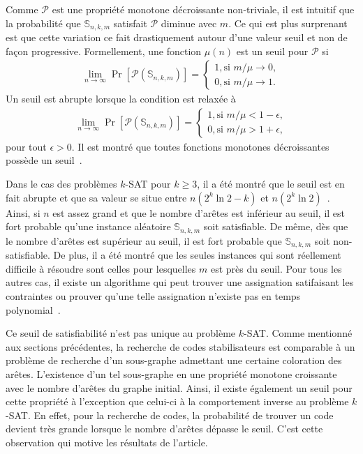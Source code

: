 Comme $\mathcal P$ est une propriété monotone décroissante non-triviale,
il est intuitif que la probabilité que $\mathbb S_{n,k,m}$ satisfait 
$\mathcal P$ diminue avec $m$.
Ce qui est plus surprenant est que cette variation ce fait drastiquement 
autour d'une valeur seuil et non de façon progressive.
Formellement,
une fonction $\mu(n)$ est un seuil pour $\mathcal P$ si 
\begin{align}
  \lim_{n \to \infty} \Pr[\mathcal P(\mathbb S_{n,k,m})] 
  =
  \begin{cases}
    1, \text{si } m / \mu \to 0, \\
    0, \text{si } m / \mu \to 1.
  \end{cases}
\end{align}
Un seuil est abrupte lorsque la condition est relaxée à
\begin{align}
  \lim_{n \to \infty} \Pr[\mathcal P(\mathbb S_{n,k,m})] 
  =
  \begin{cases}
    1, \text{si } m / \mu < 1 - \epsilon, \\
    0, \text{si } m / \mu > 1 + \epsilon,
  \end{cases}
\end{align}
pour tout $\epsilon > 0$.
Il est montré que toutes fonctions monotones décroissantes
possède un seuil~\cite{bollobas_threshold_1987}.

Dans le cas des problèmes $k$-SAT pour $k \geq 3$,
il a été montré que le seuil est en fait abrupte et que sa valeur se
situe entre $n(2^k \ln 2 - k)$ et $n(2^k \ln 2)$~\cite{achlioptas_rigorous_2005}.
Ainsi, si $n$ est assez grand et que le nombre d'arêtes est inférieur au seuil,
il est fort probable qu'une instance aléatoire $\mathbb S_{n,k,m}$ soit satisfiable.
De même,
dès que le nombre d'arêtes est supérieur au seuil,
il est fort probable que $\mathbb S_{n, k, m}$ soit non-satisfiable.
De plus, il a été montré que les seules instances qui sont réellement difficile
à résoudre sont celles pour lesquelles $m$ est près du seuil.
Pour tous les autres cas,
il existe un algorithme qui peut trouver une assignation satifaisant les contraintes
ou prouver qu'une telle assignation n'existe pas en temps polynomial~\cite{cheeseman_where_1991}.

Ce seuil de satisfiabilité n'est pas unique au problème $k$-SAT.
Comme mentionné aux sections précédentes,
la recherche de codes stabilisateurs est comparable à un problème de recherche d'un sous-graphe
admettant une certaine coloration des arêtes.
L'existence d'un tel sous-graphe
en une propriété monotone croissante avec le nombre d'arêtes du graphe initial.
Ainsi,
il existe également un seuil pour cette propriété à l'exception que celui-ci à la comportement 
inverse au problème $k$-SAT.
En effet,
pour la recherche de codes, 
la probabilité de trouver un code devient très grande lorsque le nombre d'arêtes dépasse le seuil.
C'est cette observation qui motive les résultats de l'article.

